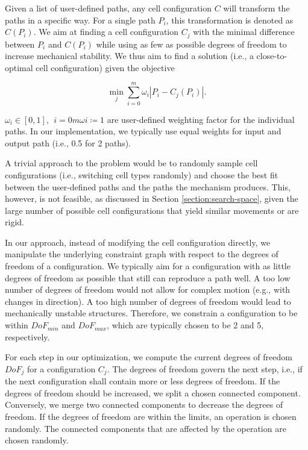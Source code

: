 Given a list of user-defined paths, any cell configuration $C$ will transform the paths in a specific way. For a single path $P_i$, this transformation is denoted as $C\left(P_i\right)$. We aim at finding a cell configuration $C_j$ with the minimal difference between $P_i$ and $C\left(P_i\right)$ while using as few as possible degrees of freedom to increase mechanical stability. We thus aim to find a solution (i.e., a close-to-optimal cell configuration) given the objective

$$\min_j{\sum_{i=0}^{m}{\omega_i \left| P_i-C_j \left( P_i \right) \right|.}}$$

$\omega_i\in\left[0,1\right],\ \ i=0mωi≔1$ are user-defined weighting factor for the individual paths. In our implementation, we typically use equal weights for input and output path (i.e., 0.5 for 2 paths).

A trivial approach to the problem would be to randomly sample cell configurations (i.e., switching cell types randomly) and choose the best fit between the user-defined paths and the paths the mechanism produces. This, however, is not feasible, as discussed in Section \ref{section:search-space}, given the large number of possible cell configurations that yield similar movements or are rigid. 

In our approach, instead of modifying the cell configuration directly, we manipulate the underlying constraint graph with respect to the degrees of freedom of a configuration. We typically aim for a configuration with as little degrees of freedom as possible that still can reproduce a path well. A too low number of degrees of freedom would not allow for complex motion (e.g., with changes in direction). A too high number of degrees of freedom would lead to mechanically unstable structures. Therefore, we constrain a configuration to be within ${DoF}_{min}$ and ${DoF}_{max}$, which are typically chosen to be 2 and 5, respectively. 

For each step in our optimization, we compute the current degrees of freedom ${DoF}_j$ for a configuration $C_j$. The degrees of freedom govern the next step, i.e., if the next configuration shall contain more or less degrees of freedom. If the degrees of freedom should be increased, we split a chosen connected component. Conversely, we merge two connected components to decrease the degrees of freedom. If the degrees of freedom are within the limits, an operation is chosen randomly. The connected components that are affected by the operation are chosen randomly. 


